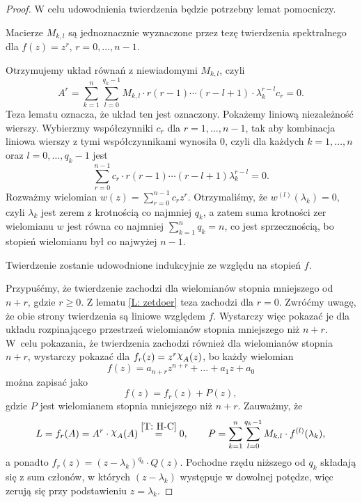 \begin{proof}
  W celu udowodnienia twierdzenia będzie potrzebny lemat pomocniczy.
  \begin{nestedlemma} \label{L: zetdoer}
    Macierze $M_{k,l}$ są jednoznacznie wyznaczone przez tezę twierdzenia spektralnego dla
    $f(z) = z^r$, $r = 0, \ldots, n-1$.
  \end{nestedlemma}
  \begin{nestedproof}
    Otrzymujemy układ równań z niewiadomymi $M_{k,l}$, czyli
    \begin{equation*}
      A^r = \sum_{k=1}^n \sum_{l=0}^{q_k-1} M_{k,l} \cdot r (r-1) \cdots (r-l+1) \cdot \lambda_k^{r-l} c_r = 0.
    \end{equation*}
    Teza lematu oznacza, że układ ten jest oznaczony. Pokażemy liniową niezależność wierszy. Wybierzmy współczynniki 
    $c_r$ dla $r = 1, \ldots, n-1$, tak aby kombinacja liniowa wierszy z tymi współczynnikami wynosiła $0$, czyli dla
    każdych $k = 1,\ldots,n$ oraz $l = 0, \ldots, q_k-1$ jest
    \begin{equation*}
      \sum_{r=0}^{n-1} c_r \cdot r (r-1) \cdots (r-l+1) \lambda_k^{r-l} = 0.
    \end{equation*}
    Rozważmy wielomian $w(z) = \sum_{r=0}^{n-1} c_r z^r$. Otrzymaliśmy, że $w^{(l)}(\lambda_k) = 0$, czyli 
    $\lambda_k$ jest zerem z krotnością co najmniej $q_k$, a zatem suma krotności zer wielomianu $w$ jest równa co 
    najmniej $\sum_{k=1}^n q_k = n$, co jest sprzecznością, bo stopień wielomianu był co najwyżej $n-1$.
  \end{nestedproof}
  Twierdzenie zostanie udowodnione indukcyjnie ze względu na stopień $f$.
  
  Przypuśćmy, że twierdzenie zachodzi dla wielomianów stopnia mniejszego od $n+r$, gdzie $r \geq 0$. Z lematu 
  \ref{L: zetdoer} teza zachodzi dla $r=0$. Zwróćmy uwagę, że obie strony twierdzenia są liniowe względem $f$. 
  Wystarczy więc pokazać je dla układu rozpinającego przestrzeń wielomianów stopnia mniejszego niż $n+r$. W~celu 
  pokazania, że twierdzenia zachodzi również dla wielomianów stopnia $n+r$, wystarczy pokazać dla $f_r(z) = z^r 
  \mychi_A(z)$, bo każdy wielomian
  \begin{equation*}
    f(z) = a_{n+r} z^{n+r} + \ldots + a_1 z + a_0
  \end{equation*}
  można zapisać jako
  \begin{equation*}
    f(z) = f_r(z) + P(z),
  \end{equation*}
  gdzie $P$ jest wielomianem stopnia mniejszego niż $n+r$. Zauważmy, że
  \begin{equation*}
    L = f_r(A) = A^r \cdot \mychi_A(A) \overset{\ref{T: H-C}}{=} 0, \qquad 
    P = \sum_{k=1}^n \sum_{l=0}^{q_k-1} M_{k,l} \cdot f^{(l)}(\lambda_k),
  \end{equation*}
  a ponadto $f_r(z) = (z-\lambda_k)^{q_k} \cdot Q(z)$. Pochodne rzędu niższego od $q_k$ składają się z sum członów, w 
  których $(z-\lambda_k)$ występuje w dowolnej potędze, więc zerują się przy podstawieniu $z=\lambda_k$.
\end{proof}
